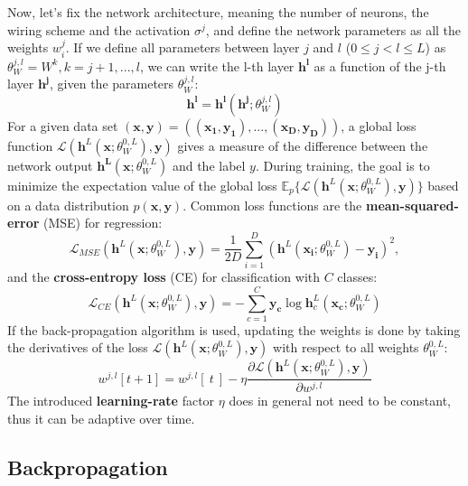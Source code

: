\documentclass[main]{subfiles}
\begin{document}
	
	\noindent
	Now, let's fix the network architecture, meaning the number of neurons, the wiring scheme and the activation $\sigma^j$, and define the network parameters as all the weights $w_{i}^{j}$. If we define all parameters between layer $j$ and $l$ ($0 \leq j < l \leq L$) as $\theta^{j,l}_W = {W^k, k=j+1,...,l}$, we can write the l-th layer $\bm{h^l}$ as a function of the j-th layer $\bm{h^j}$, given the parameters $\theta^{j,l}_W$:
	\begin{equation}
	\bm{h^l} = \bm{h^l}(\bm{h^j}; \theta^{j,l}_W)
	\end{equation}
	For a given data set $(\bm{x}, \bm{y})=((\bm{x_1}, \bm{y_1}), ..., (\bm{x_D}, \bm{y_D}))$, a global loss function $\mathcal{L}(\bm{h}^L(\bm{x}; \theta^{0,L}_W), \bm{y})$ gives a measure of the difference between the network output $\bm{h^L}(\bm{x}; \theta^{0,L}_W)$ and the label $y$. During training, the goal is to minimize the expectation value of the global loss $\mathbb{E}_p\{\mathcal{L}(\bm{h}^L(\bm{x}; \theta^{0,L}_W), \bm{y}) \}$ based on a data distribution $p(\bm{x}, \bm{y})$. Common loss functions are the \textbf{mean-squared-error} (MSE) for regression:
	\begin{equation}
	\mathcal{L}_{MSE}(\bm{h}^L(\bm{x}; \theta^{0,L}_W), \bm{y}) = \frac{1}{2D} \sum_{i=1}^D(\bm{h}^L(\bm{x_i}; \theta^{0,L}_W) - \bm{y_i})^2,
	\end{equation}
	and the \textbf{cross-entropy loss} (CE) for classification with $C$ classes:
	\begin{equation}
	\mathcal{L}_{CE}(\bm{h}^L(\bm{x}; \theta^{0,L}_W), \bm{y}) = - \sum_{c=1}^C \bm{y_c} \log{\bm{h}_c^{L}(\bm{x_c}; \theta^{0,L}_W)} 
	\end{equation}
	\noindent
	If the back-propagation algorithm is used, updating the weights is done by taking the derivatives of the loss $\mathcal{L}(\bm{h}^L(\bm{x}; \theta^{0,L}_W), \bm{y})$ with respect to all weights $\theta^{0,L}_W$: 
	\begin{equation}
	w^{j,l}[t+1] = w^{j,l}[\ t\ ] - \eta \frac{\partial \mathcal{L}(\bm{h}^L(\bm{x}; \theta^{0,L}_W), \bm{y}) }{\partial w^{j,l}}
	\end{equation}
	The introduced \textbf{learning-rate} factor $\eta$ does in general not need to be constant, thus it can be adaptive over time. 
	
\subsection{Backpropagation}
\end{document}
